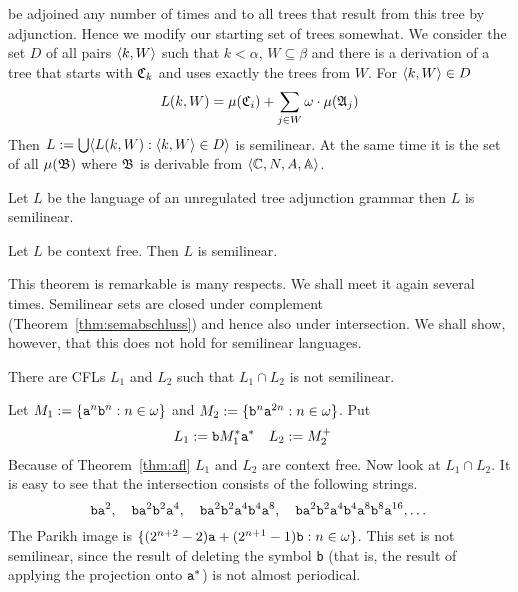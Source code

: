be adjoined any number of times and to all trees that result
from this tree by adjunction. Hence we modify our starting set
of trees somewhat. We consider the set $D$ of all pairs
$\langle k, W\rangle$ such that $k < \alpha$, $W \subseteq \beta$ and
there is a derivation of a tree that starts with $\mathfrak{C}_k$ and
uses exactly the trees from $W$. For $\langle k, W\rangle \in D$
\begin{equation}
L(k,W) = \mu(\mathfrak{C}_i) + \sum_{j \in W} \omega \cdot \mu(\mathfrak{A}_j)
\end{equation}
Then $L := \bigcup \langle L(k,W) : \langle k,W\rangle \in D\rangle$
is semilinear. At the same time it is the set of
all $\mu(\mathfrak{B})$ where $\mathfrak{B}$ is derivable from $\auf \BC, N, A, %
\BA\zu$. 
\begin{thm}
Let $L$ be the language of an unregulated tree adjunction grammar
then $L$ is semilinear.
\proofend
\end{thm}
\begin{cor}[Parikh]
Let $L$ be context free. Then $L$ is semilinear. \proofend
\end{cor}
This theorem is remarkable is many respects. We shall
meet it again several times. Semilinear sets are closed under
complement (Theorem~\ref{thm:semabschluss}) and hence also
under intersection. We shall show, however, that this does not hold
for semilinear languages.
\begin{prop}
There are CFLs $L_1$ and $L_2$ such that $L_1 \cap L_2$ is not semilinear.
\end{prop}
\proofbeg
Let $M_1 := \{\mbox{\tt a}^n \mbox{\tt b}^n :
n \in \omega\}$ and $M_2 := \{\mbox{\tt b}^n \mbox{\tt a}^{2n} :
n \in \omega\}$. Put
\begin{align}
L_1 & := \mbox{\tt b} M_1^{\ast} \mbox{\tt a}^{\ast} &
L_2 & := M_2^+
\end{align}
Because of Theorem~\ref{thm:afl} $L_1$ and $L_2$ are context free.
Now look at $L_1 \cap L_2$. It is easy to see that the intersection
consists of the following strings.
\begin{equation}
\mbox{\tt ba}^2, \quad \mbox{\tt ba}^2 \mbox{\tt b}^2\mbox{\tt a}^4,
\quad \mbox{\tt ba}^2\mbox{\tt b}^2\mbox{\tt a}^4\mbox{\tt
    b}^4\mbox{\tt a}^8, \quad
\mbox{\tt ba}^2\mbox{\tt b}^2 \mbox{\tt a}^4\mbox{\tt
    b}^4 \mbox{\tt a}^8 \mbox{\tt b}^8 \mbox{\tt a}^{16}, \dotsc
\end{equation}
The Parikh image is $\{(2^{n+2}-2)\mbox{\tt a} +
(2^{n+1} - 1)\mbox{\tt b} : n \in \omega\}$.  This set is not
semilinear, since the result of deleting the symbol {\tt b} (that
is, the result of applying the projection onto
$\mbox{\tt a}^{\ast}$) is not almost periodical.
\proofend

